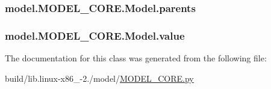 \subsubsection[{parents}]{\setlength{\rightskip}{0pt plus 5cm}model.\+M\+O\+D\+E\+L\+\_\+\+C\+O\+R\+E.\+Model.\+parents}\label{classmodel_1_1MODEL__CORE_1_1Model_a825d8f80266a50175b837454e720edea}
\hypertarget{classmodel_1_1MODEL__CORE_1_1Model_a3cd14a8cfe0b78fe365e968d2f535bb3}{}
\subsubsection[{value}]{\setlength{\rightskip}{0pt plus 5cm}model.\+M\+O\+D\+E\+L\+\_\+\+C\+O\+R\+E.\+Model.\+value}\label{classmodel_1_1MODEL__CORE_1_1Model_a3cd14a8cfe0b78fe365e968d2f535bb3}


The documentation for this class was generated from the following file\+:\begin{DoxyCompactItemize}
\item 
build/lib.\+linux-\/x86\+\_-\/2./model/\hyperlink{build_2lib_8linux-x86__64-2_87_2model_2MODEL__CORE_8py}{M\+O\+D\+E\+L\+\_\+\+C\+O\+R\+E.\+py}\end{DoxyCompactItemize}
